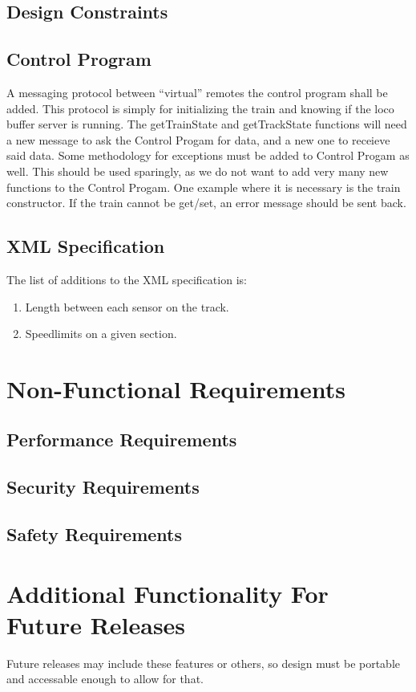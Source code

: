 \documentclass[a4paper,11pt,notitlepage]{article}
\def\CS{Control Progam\xspace}
\begin{document}
\subsection{Design Constraints}
\subsection{Control Program}
    A messaging protocol between ``virtual'' remotes the control program shall be added.  This protocol is simply for initializing the train and knowing if the loco buffer server is running. The getTrainState and getTrackState functions will need a new message to ask the \CS for data, and a new one to receieve said data.
	Some methodology for exceptions must be added to \CS as well. This should be used sparingly, as we do not want to add very many new functions to the \CS. One example where it is necessary is the train constructor. If the train cannot be get/set, an error message should be sent back.
\subsection{XML Specification}
    The list of additions to the XML specification is:
\begin{enumerate}
    \item Length between each sensor on the track.
    \item Speedlimits on a given section.
\end{enumerate}

\newpage
\section{Non-Functional Requirements}
\subsection{Performance Requirements}
\subsection{Security Requirements}
\subsection{Safety Requirements}

\newpage
\section{Additional Functionality For Future Releases}
Future releases may include these features or others, so design must be portable and accessable enough to allow for that.
\end{document}
